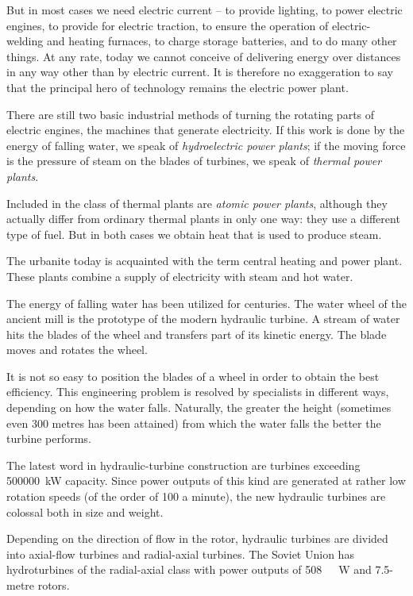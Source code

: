 But in most cases we need electric current -- to provide lighting, to power electric engines, to provide for electric traction, to ensure the operation of electric-welding and heating furnaces, to charge storage batteries, and to do many other things. At any rate, today we cannot con­ceive of delivering energy over distances in any way other than by electric current. It is therefore no exaggeration to say that the principal hero of technology remains the electric power plant.

There are still two basic industrial methods of turning the rotating parts of electric engines, the machines that generate electricity. If this work is done by the energy of falling water, we speak of \emph{hydroelectric power plants}; if the moving force is the pressure of steam on the blades of turbines, we speak of \emph{thermal power plants}.

Included in the class of thermal plants are \emph{atomic power plants}, although they actually differ from ordinary thermal plants in only one way: they use a different type of fuel. But in both cases we obtain heat that is used to produce steam.

The urbanite today is acquainted with the term central heating and power plant. These plants combine a supply of electricity with steam and hot water.

The energy of falling water has been utilized for cen­turies. The water wheel of the ancient mill is the proto­type of the modern hydraulic turbine. A stream of water hits the blades of the wheel and transfers part of its kinetic energy. The blade moves and rotates the wheel.

It is not so easy to position the blades of a wheel in order to obtain the best efficiency. This engineering problem is resolved by specialists in different ways, depending on how the water falls. Naturally, the greater the height (sometimes even 300 metres has been attained) from which the water falls the better the turbine performs.

The latest word in hydraulic-turbine construction are turbines exceeding \SI{500 000}{\kilo\watt} capacity. Since pow­er outputs of this kind are generated at rather low ro­tation speeds (of the order of 100 a minute), the new hydraulic turbines are colossal both in size and weight.

Depending on the direction of flow in the rotor, hy­draulic turbines are divided into axial-flow turbines and radial-axial turbines. The Soviet Union has hydroturbines of the radial-axial class with power outputs of \SI{508}{\mega­\watt} and 7.5-metre rotors.

